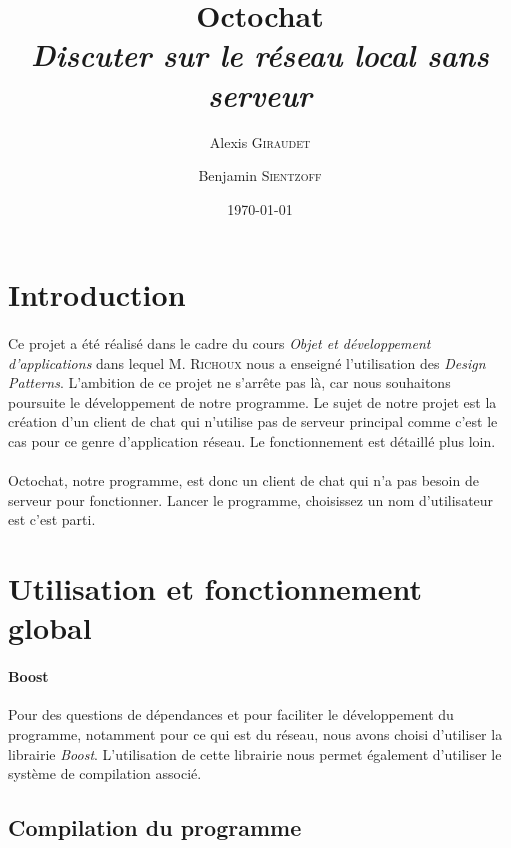 \documentclass[a4paper]{article}
\title{Octochat \\ \textit{Discuter sur le réseau local sans serveur}}
\author{Alexis \textsc{Giraudet} \and Benjamin \textsc{Sientzoff}}
\date{\today}
\begin{document}
	\maketitle
	\vspace{5cm}
	\tableofcontents
	\newpage %
	
	\section*{Introduction}
		\paragraph{}{
		Ce projet a été réalisé dans le cadre du cours \textit{Objet et développement d'applications}
		dans lequel M. \textsc{Richoux} nous a enseigné l'utilisation des \textit{Design Patterns}.
		L'ambition de ce projet ne s'arrête pas là, car nous souhaitons poursuite le développement de notre 
		programme. Le sujet de notre projet est la création d'un client de chat qui n'utilise pas de serveur
		principal comme c'est le cas pour ce genre d'application réseau. Le fonctionnement est détaillé plus loin.
		}
		\paragraph{}{
		Octochat, notre programme, est donc un client de chat qui n'a pas besoin de serveur pour fonctionner.
		Lancer le programme, choisissez un nom d'utilisateur est c'est parti.
		}
	
	\newpage
	
	\section{Utilisation et fonctionnement global}
	
		\paragraph{Boost}{
		Pour des questions de dépendances et pour faciliter le développement du programme, notamment pour ce qui est du réseau,
		nous avons choisi d'utiliser la librairie \textit{Boost}.
		L’utilisation de cette librairie nous permet également d'utiliser le système de compilation associé.
		}
	
		\subsection{Compilation du programme}
\end{document}
